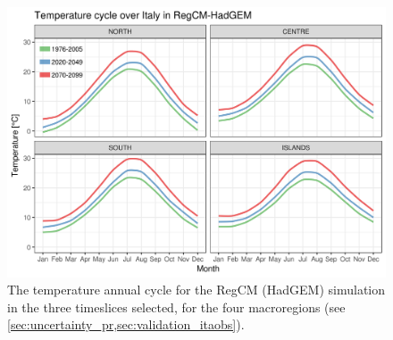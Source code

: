 \begin{figure}
    \centering
    \includegraphics[width=\textwidth]{figures/change_rcm/tas/ac}
    \decoRule
    \caption[Future change in the temperature annual cycle]{
        The temperature annual cycle for the RegCM (HadGEM) simulation in the three timeslices selected, for the four macroregions (see \cref{sec:uncertainty_pr,sec:validation_itaobs}).
    }\label{fig:change_rcm_tas_ac}
\end{figure}
